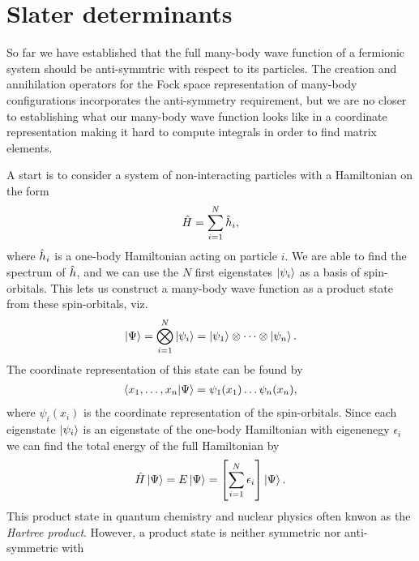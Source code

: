     \section{Slater determinants}
        So far we have established that the full many-body wave function of a
        fermionic system should be anti-symmtric with respect to its particles.
        The creation and annihilation operators for the Fock space
        representation of many-body configurations incorporates the
        anti-symmetry requirement, but we are no closer to establishing what our
        many-body wave function looks like in a coordinate representation making
        it hard to compute integrals in order to find matrix elements.

        A start is to consider a system of non-interacting particles with a
        Hamiltonian on the form
        \begin{align}
            \hat{H} = \sum_{i = 1}^{N} \hat{h}_i,
        \end{align}
        where $\hat{h}_i$ is a one-body Hamiltonian acting on particle $i$. We
        are able to find the spectrum of $\hat{h}$, and we can use the $N$
        first eigenstates $\ket{\psi_i}$ as a basis of spin-orbitals.
        This lets us construct a many-body wave function as a product state from
        these spin-orbitals, viz.
        \begin{align}
            \ket{\Psi}
            = \bigotimes_{i = 1}^{N}\ket{\psi_i}
            = \ket{\psi_1}\otimes\dots\otimes\ket{\psi_n}.
        \end{align}
        The coordinate representation of this state can be found by
        \begin{align}
            \braket{x_1, \dots, x_n}{\Psi}
            = \psi_1(x_1)\dots\psi_n(x_n),
        \end{align}
        where $\psi_i(x_i)$ is the coordinate representation of the
        spin-orbitals.
        Since each eigenstate $\ket{\psi_i}$ is an eigenstate of the one-body
        Hamiltonian with eigenenegy $\epsilon_i$ we can find the total energy of
        the full Hamiltonian by
        \begin{align}
            \hat{H}\ket{\Psi}
            = E\ket{\Psi}
            = \left[ 
                \sum_{i = 1}^{N}
                \epsilon_i
             \right]\ket{\Psi}.
        \end{align}
        This product state in quantum chemistry and nuclear physics often knwon
        as the \emph{Hartree product}.
        However, a product state is neither symmetric nor anti-symmetric with
